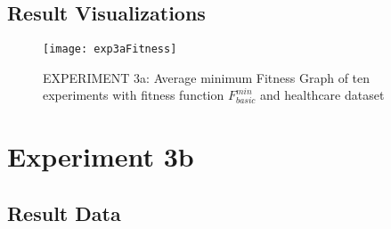	\subsection{Result Visualizations}
	\label{sec:A_Exp3a_Diagrams}
		\begin{figure}[H]
	    	\centering
	    	\texttt{[image: exp3aFitness]}
	    	\caption{EXPERIMENT 3a: Average minimum Fitness Graph of ten experiments with fitness function $F_{basic}^{min}$ and healthcare dataset}
	    	\label{fig:exp3afitness}
		\end{figure}

\section{Experiment 3b}
\label{sec:A_Exp3b}
	\subsection{Result Data}
	\label{sec:A_Exp3b_Data}
